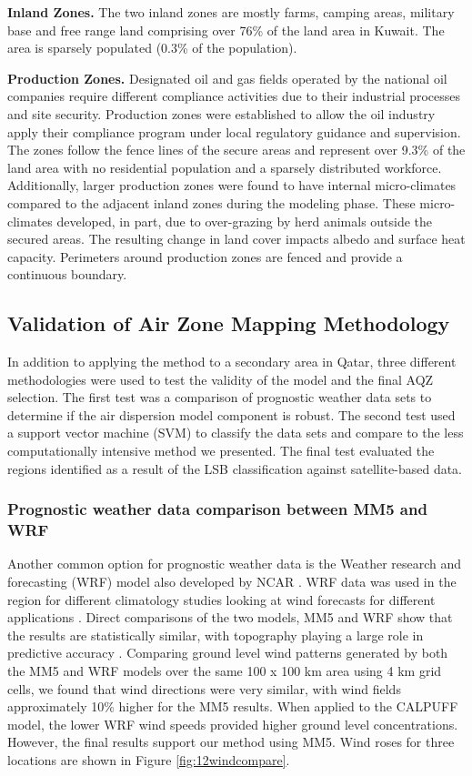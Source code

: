 \textbf{Inland Zones.} The two inland zones are mostly farms, camping areas, military base and free range land comprising over 76\% of the land area in Kuwait. The area is sparsely populated (0.3\% of the population).  

\textbf{Production Zones.} Designated oil and gas fields operated by the national oil companies require different compliance activities due to their industrial processes and site security. Production zones were established to allow the oil industry apply their compliance program under local regulatory guidance and supervision. The zones follow the fence lines of the secure areas and represent over 9.3\% of the land area with no residential population and a sparsely distributed workforce. Additionally, larger production zones were found to have internal micro-climates compared to the adjacent inland zones during the modeling phase.  These micro-climates developed, in part, due to over-grazing by herd animals outside the secured areas.  The resulting change in land cover impacts albedo and surface heat capacity. Perimeters around production zones are fenced and provide a continuous boundary.

\subsection{Validation of Air Zone Mapping Methodology}

In addition to applying the method to a secondary area in Qatar, three different methodologies were used to test the validity of the model and the final AQZ selection. The first test was a comparison of prognostic weather data sets to determine if the air dispersion model component is robust. The second test used a support vector machine (SVM) to classify the data sets and compare to the less computationally intensive method we presented. The final test evaluated the regions identified as a result of the LSB classification against satellite-based data.

\subsubsection{Prognostic weather data comparison between MM5 and WRF}

Another common option for prognostic weather data is the Weather research and forecasting (WRF) model also developed by NCAR \citep{Skamarock2008}. WRF data was used in the region for different climatology studies looking at wind forecasts for different applications \citep{Amjad2015}. Direct comparisons of the two models, MM5 and WRF show that the results are statistically similar, with topography playing a large role in predictive accuracy \citep{Gsella2014, Henmi2004}. Comparing ground level wind patterns generated by both the MM5 and WRF models over the same 100 x 100 km area using 4 km grid cells, we found that wind directions were very similar, with wind fields approximately 10\% higher for the MM5 results. When applied to the CALPUFF model, the lower WRF wind speeds provided higher ground level concentrations. However, the final results support our method using MM5. Wind roses for three locations are shown in Figure \ref{fig:12windcompare}.
      
